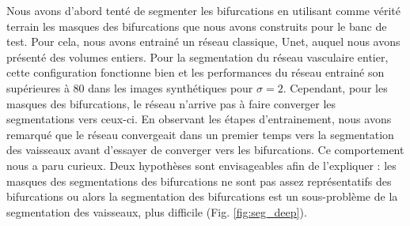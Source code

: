 Nous avons d'abord tenté de segmenter les bifurcations en utilisant comme vérité terrain les masques des bifurcations que nous avons construits pour le banc de test. Pour cela, nous avons entrainé un réseau classique, Unet, auquel nous avons présenté des volumes entiers. Pour la segmentation du réseau vasculaire entier, cette configuration fonctionne bien et les performances du réseau entrainé son supérieures à 80 \percent{}dans les images synthétiques pour $\sigma=2$. Cependant, pour les masques des bifurcations, le réseau n'arrive pas à faire converger les segmentations vers ceux-ci. En observant les étapes d'entrainement, nous avons remarqué que le réseau convergeait dans un premier temps vers la segmentation des vaisseaux avant d'essayer de converger vers les bifurcations. Ce comportement nous a paru curieux. Deux hypothèses sont envisageables afin de l'expliquer : les masques des segmentations des bifurcations ne sont pas assez représentatifs des bifurcations ou alors la segmentation des bifurcations est un sous-problème de la segmentation des vaisseaux, plus difficile (Fig. \ref{fig:seg_deep}).


